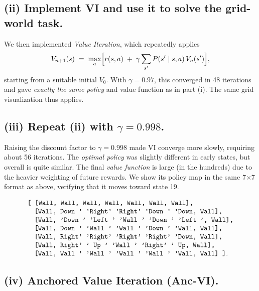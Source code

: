\subsection*{(ii) Implement VI and use it to solve the grid-world task.}

\noindent
We then implemented \emph{Value Iteration}, which repeatedly applies
\[
  V_{n+1}(s) \;=\;\max_a\Bigl[r(s,a)\;+\;\gamma\sum_{s'}P(s'\mid s,a)\,V_n(s')\Bigr],
\]
starting from a suitable initial $V_0$. With $\gamma=0.97$, 
this converged in 48 iterations and gave \emph{exactly the same policy} and value function 
as in part (i). The same grid visualization thus applies.

\subsection*{(iii) Repeat (ii) with $\gamma=0.998$.}

\noindent
Raising the discount factor to $\gamma=0.998$ made VI converge more slowly, requiring 
about 56 iterations. The \emph{optimal policy} was slightly different in early states, but 
overall is quite similar. The final \emph{value function} is large (in the hundreds) due to 
the heavier weighting of future rewards. We show its policy map in the same 7$\times$7 
format as above, verifying that it moves toward state 19.

\[
\begin{array}{l}
\text{\ttfamily
[ [Wall,  Wall,  Wall,  Wall,  Wall,  Wall,  Wall],}\\
\quad \text{\ttfamily [Wall, Down ' 'Right' 'Right' 'Down ' 'Down, Wall],}\\
\quad \text{\ttfamily [Wall, 'Down ' 'Left ' 'Wall ' 'Down ' 'Left  ', Wall],}\\
\quad \text{\ttfamily [Wall, Down ' 'Wall ' 'Wall ' 'Down ' 'Wall, Wall],}\\
\quad \text{\ttfamily [Wall, Right' 'Right' 'Right' 'Right' 'Down, Wall],}\\
\quad \text{\ttfamily [Wall, Right' ' Up  ' 'Wall ' 'Right' ' Up,   Wall],}\\
\quad \text{\ttfamily [Wall, Wall ' 'Wall ' 'Wall ' 'Wall ' 'Wall, Wall] ]}.
\end{array}
\]

\subsection*{(iv) Anchored Value Iteration (Anc-VI).}

